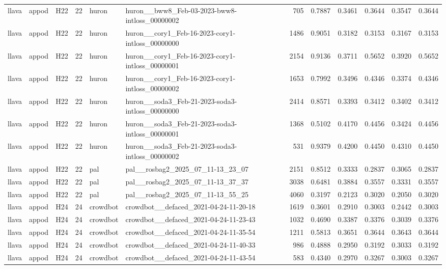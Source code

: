 \begin{table}[tbp]
\begin{tabular}{lllrllrrrrrr}
llava & appod & H22 & 22 & huron & huron\_\_bww8\_Feb-03-2023-bww8-intloss\_00000002 & 705 & 0.7887 & 0.3461 & 0.3644 & 0.3547 & 0.3644 \\
llava & appod & H22 & 22 & huron & huron\_\_cory1\_Feb-16-2023-cory1-intloss\_00000000 & 1486 & 0.9051 & 0.3182 & 0.3153 & 0.3167 & 0.3153 \\
llava & appod & H22 & 22 & huron & huron\_\_cory1\_Feb-16-2023-cory1-intloss\_00000001 & 2154 & 0.9136 & 0.3711 & 0.5652 & 0.3920 & 0.5652 \\
llava & appod & H22 & 22 & huron & huron\_\_cory1\_Feb-16-2023-cory1-intloss\_00000002 & 1653 & 0.7992 & 0.3496 & 0.4346 & 0.3374 & 0.4346 \\
llava & appod & H22 & 22 & huron & huron\_\_soda3\_Feb-21-2023-soda3-intloss\_00000000 & 2414 & 0.8571 & 0.3393 & 0.3412 & 0.3402 & 0.3412 \\
llava & appod & H22 & 22 & huron & huron\_\_soda3\_Feb-21-2023-soda3-intloss\_00000001 & 1368 & 0.5102 & 0.4170 & 0.4456 & 0.3424 & 0.4456 \\
llava & appod & H22 & 22 & huron & huron\_\_soda3\_Feb-21-2023-soda3-intloss\_00000002 & 531 & 0.9379 & 0.4200 & 0.4450 & 0.4310 & 0.4450 \\
llava & appod & H22 & 22 & pal & pal\_\_rosbag2\_2025\_07\_11-13\_23\_07 & 2151 & 0.8512 & 0.3333 & 0.2837 & 0.3065 & 0.2837 \\
llava & appod & H22 & 22 & pal & pal\_\_rosbag2\_2025\_07\_11-13\_37\_37 & 3038 & 0.6481 & 0.3884 & 0.3557 & 0.3331 & 0.3557 \\
llava & appod & H22 & 22 & pal & pal\_\_rosbag2\_2025\_07\_11-13\_55\_25 & 4060 & 0.3197 & 0.2123 & 0.3020 & 0.2050 & 0.3020 \\
llava & appod & H24 & 24 & crowdbot & crowdbot\_\_defaced\_2021-04-24-11-20-18 & 1619 & 0.3601 & 0.2910 & 0.3003 & 0.2442 & 0.3003 \\
llava & appod & H24 & 24 & crowdbot & crowdbot\_\_defaced\_2021-04-24-11-23-43 & 1032 & 0.4690 & 0.3387 & 0.3376 & 0.3039 & 0.3376 \\
llava & appod & H24 & 24 & crowdbot & crowdbot\_\_defaced\_2021-04-24-11-35-54 & 1211 & 0.5813 & 0.3651 & 0.3644 & 0.3643 & 0.3644 \\
llava & appod & H24 & 24 & crowdbot & crowdbot\_\_defaced\_2021-04-24-11-40-33 & 986 & 0.4888 & 0.2950 & 0.3192 & 0.3033 & 0.3192 \\
llava & appod & H24 & 24 & crowdbot & crowdbot\_\_defaced\_2021-04-24-11-43-54 & 583 & 0.4340 & 0.2970 & 0.3267 & 0.3003 & 0.3267 \\

\end{tabular}
\end{table}

